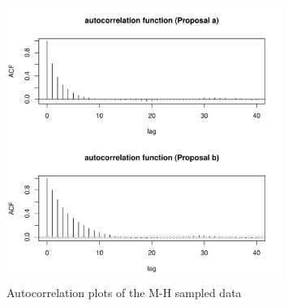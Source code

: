 \documentclass[11pt]{article}
\begin{document}
\begin{figure}[htpb]
	\centering
	\includegraphics[width=0.8\textwidth]{Ast3-Q5-acf-plot.pdf}
	\caption{Autocorrelation plots of the M-H sampled data}
	\label{fig:Ast3-Q5-acf-plot-pdf}
\end{figure}
\end{document}
